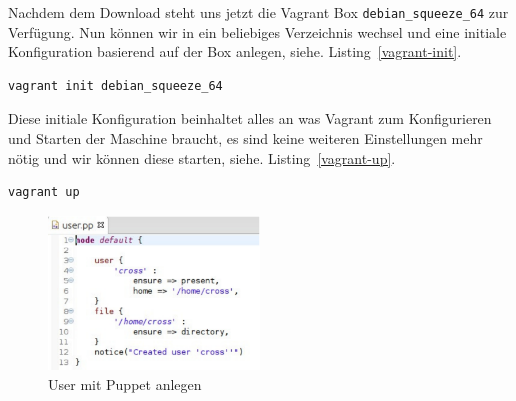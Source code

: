 \documentclass[12pt,a4paper,ngerman]{article}
\newcommand{\reflst}[1]{, siehe. Listing~\ref{#1}}
\begin{document}
Nachdem dem Download steht uns jetzt die  Vagrant Box \lstinline$debian_squeeze_64$ zur Verfügung. Nun können wir in ein beliebiges Verzeichnis wechsel und eine initiale Konfiguration basierend auf der Box anlegen\reflst{vagrant-init}.

\begin{lstlisting}[caption=Vagrant initialisieren, label=vagrant-init]
vagrant init debian_squeeze_64
\end{lstlisting}

Diese initiale Konfiguration beinhaltet alles an was Vagrant zum Konfigurieren und Starten der Maschine braucht, es sind keine weiteren Einstellungen mehr nötig und wir können diese starten\reflst{vagrant-up}.

\begin{lstlisting}[caption=Starten der Vagrant Maschine, label=vagrant-up]
vagrant up
\end{lstlisting}


\begin{figure}
  \begin{center}
    \includegraphics[width=0.5\textwidth]{images/user.pdf}
  \end{center}
  \caption{User mit Puppet anlegen}
\end{figure}



\end{document}
